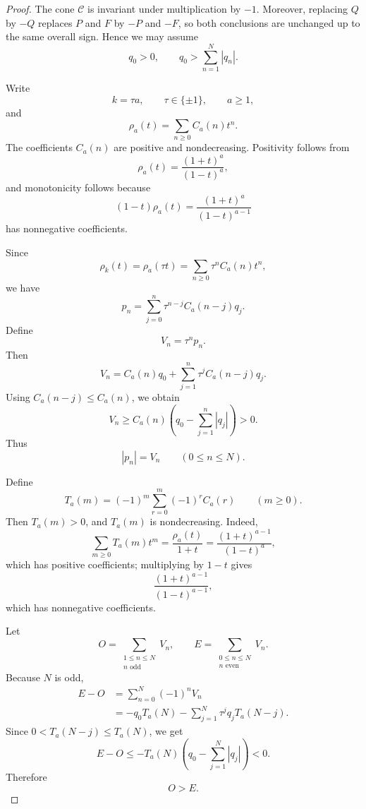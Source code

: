 \documentclass[a4paper,11pt]{amsart}
\theoremstyle{remark}
\numberwithin{equation}{section}
\begin{document}
\begin{proof}
The cone \(\mathcal C\) is invariant under multiplication by \(-1\).  Moreover, replacing \(Q\) by \(-Q\) replaces \(P\) and \(F\) by \(-P\) and \(-F\), so both conclusions are unchanged up to the same overall sign.  Hence we may assume
\[
        q_0>0,
        \qquad
        q_0>\sum_{n=1}^{N}|q_n|.
\]

Write
\[
        k=\tau a,
        \qquad
        \tau\in\{\pm1\},
        \qquad
        a\ge1,
\]
and
\[
        \rho_a(t)=\sum_{n\ge0}C_a(n)t^n.
\]
The coefficients \(C_a(n)\) are positive and nondecreasing.  Positivity follows from
\[
        \rho_a(t)=\frac{(1+t)^a}{(1-t)^a},
\]
and monotonicity follows because
\[
        (1-t)\rho_a(t)=\frac{(1+t)^a}{(1-t)^{a-1}}
\]
has nonnegative coefficients.

Since
\[
        \rho_k(t)=\rho_a(\tau t)
        =
        \sum_{n\ge0}\tau^nC_a(n)t^n,
\]
we have
\[
        p_n=\sum_{j=0}^{n}\tau^{n-j}C_a(n-j)q_j.
\]
Define
\[
        V_n=\tau^np_n.
\]
Then
\[
        V_n
        =
        C_a(n)q_0+
        \sum_{j=1}^{n}\tau^jC_a(n-j)q_j.
\]
Using \(C_a(n-j)\le C_a(n)\), we obtain
\[
        V_n
        \ge
        C_a(n)\left(q_0-\sum_{j=1}^{n}|q_j|\right)>0.
\]
Thus
\[
        |p_n|=V_n
        \qquad(0\le n\le N).
\]

Define
\[
        T_a(m)=(-1)^m\sum_{r=0}^{m}(-1)^rC_a(r)
        \qquad(m\ge0).
\]
Then \(T_a(m)>0\), and \(T_a(m)\) is nondecreasing.  Indeed,
\[
        \sum_{m\ge0}T_a(m)t^m
        =
        \frac{\rho_a(t)}{1+t}
        =
        \frac{(1+t)^{a-1}}{(1-t)^a},
\]
which has positive coefficients; multiplying by \(1-t\) gives
\[
        \frac{(1+t)^{a-1}}{(1-t)^{a-1}},
\]
which has nonnegative coefficients.

Let
\[
        O=\sum_{\substack{1\le n\le N\\ n\text{ odd}}}V_n,
        \qquad
        E=\sum_{\substack{0\le n\le N\\ n\text{ even}}}V_n.
\]
Because \(N\) is odd,
\[
\begin{aligned}
        E-O
        &=
        \sum_{n=0}^{N}(-1)^nV_n                                      \\
        &=
        -q_0T_a(N)
        -
        \sum_{j=1}^{N}\tau^jq_jT_a(N-j).
\end{aligned}
\]
Since \(0<T_a(N-j)\le T_a(N)\), we get
\[
        E-O
        \le
        -T_a(N)\left(q_0-\sum_{j=1}^{N}|q_j|\right)<0.
\]
Therefore
\[
        O>E.
\]


\end{proof}
\end{document}
